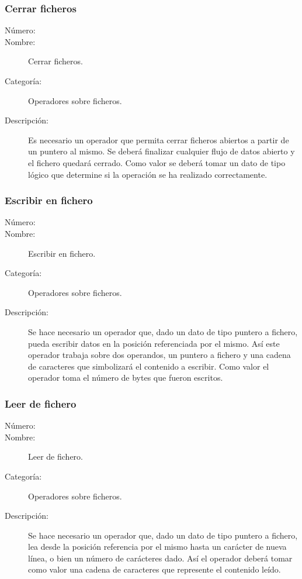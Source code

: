 \subsubsection{Cerrar ficheros}
\begin{framed}
	\begin{description}
		\item [Número:] \cn
		\item [Nombre:] Cerrar ficheros.
		\item [Categoría:] Operadores sobre ficheros.
		\item [Descripción:] Es necesario un operador que permita cerrar ficheros abiertos a partir de un puntero al mismo.
		Se deberá finalizar cualquier flujo de datos abierto y el fichero quedará cerrado. Como valor se deberá tomar 
		un dato de tipo lógico que determine si la operación se ha realizado correctamente.
	\end {description}
\end{framed}

\subsubsection{Escribir en fichero}
\begin{framed}
	\begin{description}
		\item [Número:] \cn
		\item [Nombre:] Escribir en fichero.
		\item [Categoría:] Operadores sobre ficheros.
		\item [Descripción:] Se hace necesario un operador que, dado un dato de tipo puntero a fichero, pueda escribir datos
		en la posición referenciada por el mismo. Así este operador trabaja sobre dos operandos, un puntero a fichero y una 
		cadena de caracteres que simbolizará el contenido a escribir. Como valor el operador toma el número de bytes que 
		fueron escritos.
	\end{description}
\end{framed}

\subsubsection{Leer de fichero}
\begin{framed}
	\begin{description}
		\item [Número:] \cn
		\item [Nombre:] Leer de fichero.
		\item [Categoría:] Operadores sobre ficheros.
		\item [Descripción:] Se hace necesario un operador que, dado un dato de tipo puntero a fichero, lea desde la
		posición referencia por el mismo hasta un carácter de nueva línea, o bien un número de carácteres dado. Así el operador deberá tomar como valor 
		una cadena de caracteres que represente el contenido leído.
	\end{description}
\end{framed}

